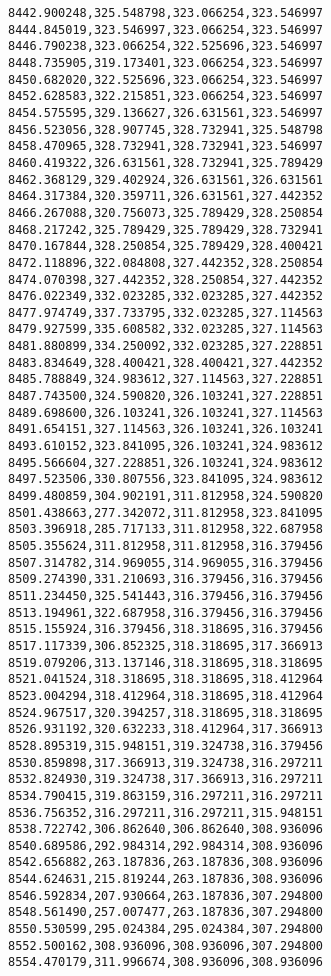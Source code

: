 \documentclass[11pt]{article}
\begin{document}
\begin{Verbatim}[commandchars=\\\{\}]
8442.900248,325.548798,323.066254,323.546997
8444.845019,323.546997,323.066254,323.546997
8446.790238,323.066254,322.525696,323.546997
8448.735905,319.173401,323.066254,323.546997
8450.682020,322.525696,323.066254,323.546997
8452.628583,322.215851,323.066254,323.546997
8454.575595,329.136627,326.631561,323.546997
8456.523056,328.907745,328.732941,325.548798
8458.470965,328.732941,328.732941,323.546997
8460.419322,326.631561,328.732941,325.789429
8462.368129,329.402924,326.631561,326.631561
8464.317384,320.359711,326.631561,327.442352
8466.267088,320.756073,325.789429,328.250854
8468.217242,325.789429,325.789429,328.732941
8470.167844,328.250854,325.789429,328.400421
8472.118896,322.084808,327.442352,328.250854
8474.070398,327.442352,328.250854,327.442352
8476.022349,332.023285,332.023285,327.442352
8477.974749,337.733795,332.023285,327.114563
8479.927599,335.608582,332.023285,327.114563
8481.880899,334.250092,332.023285,327.228851
8483.834649,328.400421,328.400421,327.442352
8485.788849,324.983612,327.114563,327.228851
8487.743500,324.590820,326.103241,327.228851
8489.698600,326.103241,326.103241,327.114563
8491.654151,327.114563,326.103241,326.103241
8493.610152,323.841095,326.103241,324.983612
8495.566604,327.228851,326.103241,324.983612
8497.523506,330.807556,323.841095,324.983612
8499.480859,304.902191,311.812958,324.590820
8501.438663,277.342072,311.812958,323.841095
8503.396918,285.717133,311.812958,322.687958
8505.355624,311.812958,311.812958,316.379456
8507.314782,314.969055,314.969055,316.379456
8509.274390,331.210693,316.379456,316.379456
8511.234450,325.541443,316.379456,316.379456
8513.194961,322.687958,316.379456,316.379456
8515.155924,316.379456,318.318695,316.379456
8517.117339,306.852325,318.318695,317.366913
8519.079206,313.137146,318.318695,318.318695
8521.041524,318.318695,318.318695,318.412964
8523.004294,318.412964,318.318695,318.412964
8524.967517,320.394257,318.318695,318.318695
8526.931192,320.632233,318.412964,317.366913
8528.895319,315.948151,319.324738,316.379456
8530.859898,317.366913,319.324738,316.297211
8532.824930,319.324738,317.366913,316.297211
8534.790415,319.863159,316.297211,316.297211
8536.756352,316.297211,316.297211,315.948151
8538.722742,306.862640,306.862640,308.936096
8540.689586,292.984314,292.984314,308.936096
8542.656882,263.187836,263.187836,308.936096
8544.624631,215.819244,263.187836,308.936096
8546.592834,207.930664,263.187836,307.294800
8548.561490,257.007477,263.187836,307.294800
8550.530599,295.024384,295.024384,307.294800
8552.500162,308.936096,308.936096,307.294800
8554.470179,311.996674,308.936096,308.936096

\end{Verbatim}
\end{document}
